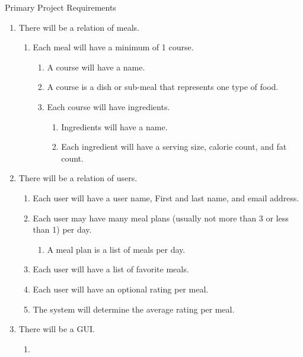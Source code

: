 \documentclass[a4paper,10pt,toc=graduated]{article}
\begin{document}
\begin{mySubsection}{Primary Project Requirements}
\renewcommand{\labelenumi}{\arabic{enumi}. }
\renewcommand{\labelenumii}{\arabic{enumi}.\arabic{enumii}. }
\renewcommand{\labelenumiii}{\arabic{enumi}.\arabic{enumii}.\arabic{enumiii}. }
\renewcommand{\labelenumiv}{\arabic{enumi}.\arabic{enumii}.\arabic{enumiii}. }
\renewcommand{\labelenumiv}{\arabic{enumi}.\arabic{enumii}.\arabic{enumiii}.\arabic{enumiv}. }

\begin{enumerate}
\item
There will be a relation of meals.
\begin{enumerate}
\item
Each meal will have a minimum of 1 course.
\begin{enumerate}
\item
A course will have a name.
\item
A course is a dish or sub-meal that represents one type of food.
\item
Each course will have ingredients.
\begin{enumerate}
\item
Ingredients will have a name.
\item
Each ingredient will have a serving size, calorie count, and fat count.
\end{enumerate}
\end{enumerate}
\end{enumerate}
\item
There will be a relation of users.
\begin{enumerate}
\item
Each user will have a user name, First and last name, and email address.
\item
Each user may have many meal plans (usually not more than 3 or less than 1) per day.
\begin{enumerate}
\item
A meal plan is a list of meals per day.
\end{enumerate}
\item
Each user will have a list of favorite meals.
\item
Each user will have an optional rating per meal.
\item
The system will determine the average rating per meal.
\end{enumerate}
\item
There will be a GUI.
\begin{enumerate}
\item

\end{enumerate}
\end{enumerate}
\end{mySubsection}
\end{document}
